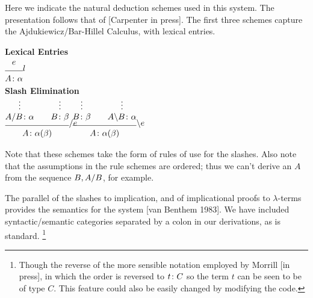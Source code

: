 
Here we indicate the natural deduction schemes used in this system.
The presentation follows that of [Carpenter in press].  
The first three schemes capture the Ajdukiewicz/Bar-Hillel Calculus,
with lexical entries.
%
\begin{center}
{\bf Lexical Entries} \\[6pt]
{\small
$\infr{e}
      {\synsem{A}{\alpha}}
      {\lexr}$
}
%
\\[18pt]
%
{\bf Slash Elimination} \\[6pt]
{\small
$\infr{\dotsover{\synsem{\fd{A}{B}}{\alpha}}
       \qquad
       \dotsover{\synsem{B}{\beta}}}
      {\synsem{A}{\alpha(\beta)}}
      {\fel}$
\qquad \qquad
$\infr{\dotsover{\synsem{B}{\beta}}
       \qquad
       \dotsover{\synsem{\bk{A}{B}}{\alpha}}}
      {\synsem{A}{\alpha(\beta)}}
      {\bel}$
}
\end{center}
%
Note that these schemes take the form of rules of use for the slashes.
Also note that the assumptions in the rule schemes are ordered;  thus
we can't derive an $A$ from the sequence $B, A / B$, for example.

The parallel of the slashes to implication, and of implicational proofs to
$\lambda$-terms provides the semantics for the system [van Benthem
1983].  We have included syntactic/semantic categories separated by a
colon in our derivations, as is standard.%
%
\footnote{Though the reverse of the more sensible notation employed by
Morrill [in press], in which the order is reversed to $t\/\colon C$
so the term $t$ can be seen to be of type $C$.  This feature could
also be easily changed by modifying the code.}

